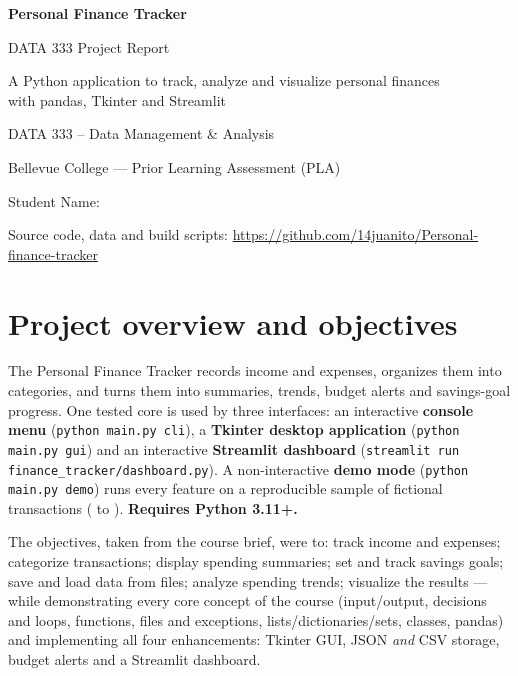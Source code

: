 \documentclass[11pt,letterpaper]{article}
\newcommand{\code}[1]{\texttt{#1}}
\begin{document}
\begin{titlepage}
  \centering
  \vspace*{3.2cm}
  {\Huge\bfseries\color{accent} Personal Finance Tracker\par}
  \vspace{0.4cm}
  {\LARGE DATA 333 Project Report\par}
  \vspace{1.2cm}
  {\large A Python application to track, analyze and visualize personal finances\\
   with pandas, Tkinter and Streamlit\par}
  \vspace{2.2cm}
  {\large DATA 333 -- Data Management \& Analysis\par}
  \vspace{0.2cm}
  {\large Bellevue College --- Prior Learning Assessment (PLA)\par}
  \vspace{2.4cm}
  {\large Student Name: \StudentNameField\par}
  \vspace{0.6cm}
  {\large \SubmissionDate\par}
  \vfill
  {\small\color{muted} Source code, data and build scripts:
   \url{https://github.com/14juanito/Personal-finance-tracker}\par}
\end{titlepage}

\section{Project overview and objectives}
The Personal Finance Tracker records income and expenses, organizes them into categories,
and turns them into summaries, trends, budget alerts and savings-goal progress. One tested
core is used by three interfaces: an interactive \textbf{console menu}
(\code{python main.py cli}), a \textbf{Tkinter desktop application}
(\code{python main.py gui}) and an interactive \textbf{Streamlit dashboard}
(\code{streamlit run finance\_tracker/dashboard.py}). A non-interactive \textbf{demo
mode} (\code{python main.py demo}) runs every feature on a reproducible sample of
\SampleCount{} fictional transactions (\SampleFirstMonth{} to \SampleLastMonth).
\textbf{Requires Python 3.11+.}

The objectives, taken from the course brief, were to: track income and expenses;
categorize transactions; display spending summaries; set and track savings goals; save and
load data from files; analyze spending trends; visualize the results --- while
demonstrating every core concept of the course (input/output, decisions and loops,
functions, files and exceptions, lists/dictionaries/sets, classes, pandas) and implementing
all four enhancements: Tkinter GUI, JSON \emph{and} CSV storage, budget alerts and a
Streamlit dashboard.
\end{document}
